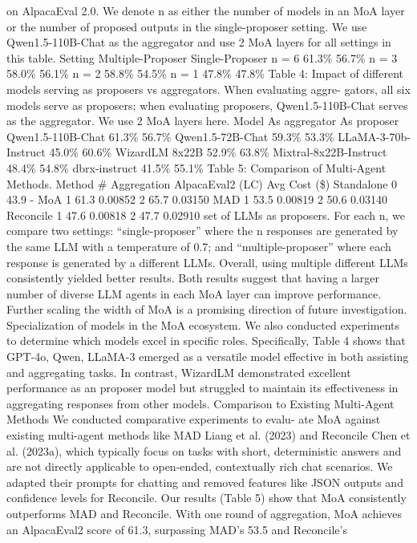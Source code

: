 on AlpacaEval 2.0. We denote n as either the
number of models in an MoA layer or the number
of proposed outputs in the single-proposer setting.
We use Qwen1.5-110B-Chat as the aggregator
and use 2 MoA layers for all settings in this table.
Setting
Multiple-Proposer
Single-Proposer
n = 6
61.3\%
56.7\%
n = 3
58.0\%
56.1\%
n = 2
58.8\%
54.5\%
n = 1
47.8\%
47.8\%
Table 4: Impact of different models serving as
proposers vs aggregators. When evaluating aggre-
gators, all six models serve as proposers; when
evaluating proposers, Qwen1.5-110B-Chat serves
as the aggregator. We use 2 MoA layers here.
Model
As aggregator
As proposer
Qwen1.5-110B-Chat
61.3\%
56.7\%
Qwen1.5-72B-Chat
59.3\%
53.3\%
LLaMA-3-70b-Instruct
45.0\%
60.6\%
WizardLM 8x22B
52.9\%
63.8\%
Mixtral-8x22B-Instruct
48.4\%
54.8\%
dbrx-instruct
41.5\%
55.1\%
Table 5: Comparison of Multi-Agent Methods.
Method
\# Aggregation
AlpacaEval2 (LC)
Avg Cost (\$)
Standalone
0
43.9
-
MoA
1
61.3
0.00852
2
65.7
0.03150
MAD
1
53.5
0.00819
2
50.6
0.03140
Reconcile
1
47.6
0.00818
2
47.7
0.02910
set of LLMs as proposers. For each n, we compare two settings: “single-proposer” where the n
responses are generated by the same LLM with a temperature of 0.7; and “multiple-proposer” where
each response is generated by a different LLMs. Overall, using multiple different LLMs consistently
yielded better results. Both results suggest that having a larger number of diverse LLM agents in each
MoA layer can improve performance. Further scaling the width of MoA is a promising direction of
future investigation.
Specialization of models in the MoA ecosystem.
We also conducted experiments to determine
which models excel in specific roles. Specifically, Table 4 shows that GPT-4o, Qwen, LLaMA-3
emerged as a versatile model effective in both assisting and aggregating tasks. In contrast, WizardLM
demonstrated excellent performance as an proposer model but struggled to maintain its effectiveness
in aggregating responses from other models.
Comparison to Existing Multi-Agent Methods
We conducted comparative experiments to evalu-
ate MoA against existing multi-agent methods like MAD Liang et al. (2023) and Reconcile Chen
et al. (2023a), which typically focus on tasks with short, deterministic answers and are not directly
applicable to open-ended, contextually rich chat scenarios. We adapted their prompts for chatting and
removed features like JSON outputs and confidence levels for Reconcile.
Our results (Table 5) show that MoA consistently outperforms MAD and Reconcile. With one round
of aggregation, MoA achieves an AlpacaEval2 score of 61.3, surpassing MAD’s 53.5 and Reconcile’s
